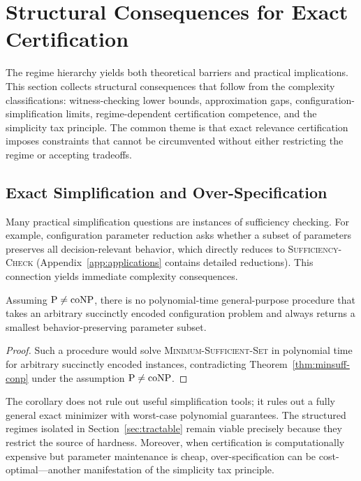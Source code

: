 \section{Structural Consequences for Exact Certification}\label{sec:structural-consequences}

The regime hierarchy yields both theoretical barriers and practical implications. This section collects structural consequences that follow from the complexity classifications: witness-checking lower bounds, approximation gaps, configuration-simplification limits, regime-dependent certification competence, and the simplicity tax principle. The common theme is that exact relevance certification imposes constraints that cannot be circumvented without either restricting the regime or accepting tradeoffs.

\subsection{Exact Simplification and Over-Specification}

Many practical simplification questions are instances of sufficiency checking. For example, configuration parameter reduction asks whether a subset of parameters preserves all decision-relevant behavior, which directly reduces to \textsc{Sufficiency-Check} (Appendix~\ref{app:applications} contains detailed reductions). This connection yields immediate complexity consequences.

\begin{corollary}
\label{cor:no-general-minimizer}
Assuming $\mathrm{P} \neq \mathrm{coNP}$, there is no polynomial-time general-purpose procedure that takes an arbitrary succinctly encoded configuration problem and always returns a smallest behavior-preserving parameter subset.
\end{corollary}

\begin{proof}
Such a procedure would solve \textsc{Minimum-Sufficient-Set} in polynomial time for arbitrary succinctly encoded instances, contradicting Theorem~\ref{thm:minsuff-conp} under the assumption $\mathrm{P} \neq \mathrm{coNP}$.
\end{proof}

\begin{remark}
The corollary does not rule out useful simplification tools; it rules out a fully general exact minimizer with worst-case polynomial guarantees. The structured regimes isolated in Section~\ref{sec:tractable} remain viable precisely because they restrict the source of hardness. Moreover, when certification is computationally expensive but parameter maintenance is cheap, over-specification can be cost-optimal—another manifestation of the simplicity tax principle.
\end{remark}


